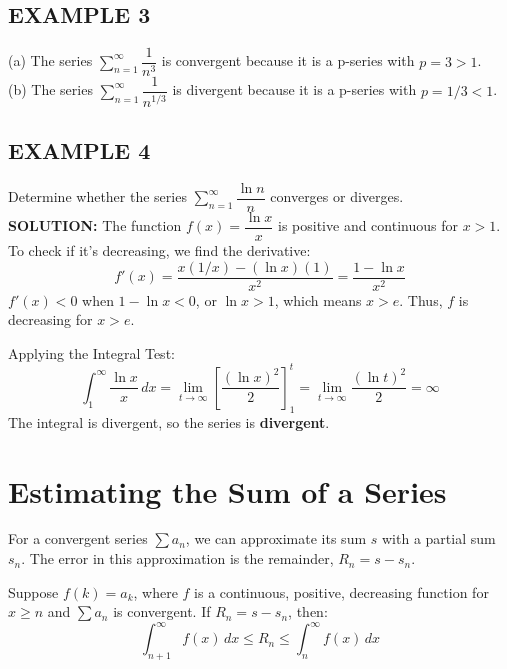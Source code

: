 \documentclass{article}
\begin{document}
\subsection*{EXAMPLE 3}
(a) The series \( \sum_{n=1}^{\infty} \dfrac{1}{n^3} \) is convergent because it is a p-series with \(p = 3 > 1\). \\
(b) The series \( \sum_{n=1}^{\infty} \dfrac{1}{n^{1/3}} \) is divergent because it is a p-series with \(p = 1/3 < 1\).\\

\subsection*{EXAMPLE 4}
Determine whether the series \( \sum_{n=1}^{\infty} \dfrac{\ln n}{n} \) converges or diverges.\\
\textbf{SOLUTION:}
The function \(f(x) = \dfrac{\ln x}{x}\) is positive and continuous for \(x>1\). To check if it's decreasing, we find the derivative:
\[ f'(x) = \dfrac{x(1/x) - (\ln x)(1)}{x^2} = \dfrac{1 - \ln x}{x^2} \]
\(f'(x) < 0\) when \(1 - \ln x < 0\), or \(\ln x > 1\), which means \(x > e\). Thus, \(f\) is decreasing for \(x > e\).

Applying the Integral Test:
\[ \int_1^\infty \dfrac{\ln x}{x} \,dx = \lim_{t\to\infty} \left[ \dfrac{(\ln x)^2}{2} \right]_1^t = \lim_{t\to\infty} \dfrac{(\ln t)^2}{2} = \infty \]
The integral is divergent, so the series is \textbf{divergent}.

\section*{Estimating the Sum of a Series}
For a convergent series \( \sum a_n \), we can approximate its sum \(s\) with a partial sum \(s_n\). The error in this approximation is the remainder, \(R_n = s - s_n\).

\begin{tcolorbox}[
    colback=white,
    colframe=orange!80!white,
    title=Remainder Estimate for the Integral Test,
    boxrule=0.5mm,
    arc=3mm
    ]
    Suppose \(f(k) = a_k\), where \(f\) is a continuous, positive, decreasing function for \(x \ge n\) and \( \sum a_n \) is convergent. If \(R_n = s - s_n\), then:
    \[ \int_{n+1}^\infty f(x) \,dx \le R_n \le \int_n^\infty f(x) \,dx \]
\end{tcolorbox}
\end{document}
